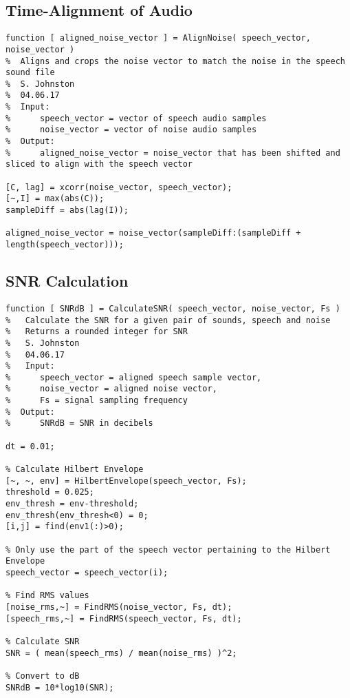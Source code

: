 \subsection{Time-Alignment of Audio}\label{app:time-align}

\begin{lstlisting}
function [ aligned_noise_vector ] = AlignNoise( speech_vector, noise_vector )
%  Aligns and crops the noise vector to match the noise in the speech sound file
%  S. Johnston
%  04.06.17
%  Input:
%      speech_vector = vector of speech audio samples
%      noise_vector = vector of noise audio samples
%  Output:
%      aligned_noise_vector = noise_vector that has been shifted and sliced to align with the speech vector

[C, lag] = xcorr(noise_vector, speech_vector);
[~,I] = max(abs(C));
sampleDiff = abs(lag(I));

aligned_noise_vector = noise_vector(sampleDiff:(sampleDiff + length(speech_vector)));
\end{lstlisting}


\subsection{SNR Calculation}

\begin{lstlisting}
function [ SNRdB ] = CalculateSNR( speech_vector, noise_vector, Fs )
%   Calculate the SNR for a given pair of sounds, speech and noise
%   Returns a rounded integer for SNR
%   S. Johnston
%   04.06.17
%   Input:
%      speech_vector = aligned speech sample vector,
%      noise_vector = aligned noise vector,
%      Fs = signal sampling frequency
%  Output:
%      SNRdB = SNR in decibels

dt = 0.01;

% Calculate Hilbert Envelope
[~, ~, env] = HilbertEnvelope(speech_vector, Fs);
threshold = 0.025;
env_thresh = env-threshold;
env_thresh(env_thresh<0) = 0;
[i,j] = find(env1(:)>0);

% Only use the part of the speech vector pertaining to the Hilbert Envelope
speech_vector = speech_vector(i);

% Find RMS values
[noise_rms,~] = FindRMS(noise_vector, Fs, dt);
[speech_rms,~] = FindRMS(speech_vector, Fs, dt);

% Calculate SNR
SNR = ( mean(speech_rms) / mean(noise_rms) )^2;

% Convert to dB
SNRdB = 10*log10(SNR);
\end{lstlisting}

